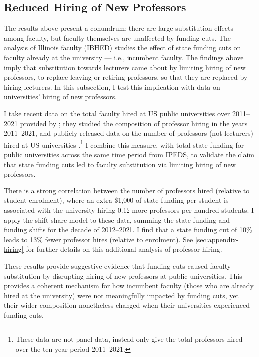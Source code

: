 \subsection{Reduced Hiring of New Professors}
The results above present a conundrum: there are large substitution effects among faculty, but faculty themselves are unaffected by funding cuts.
The analysis of Illinois faculty (IBHED) studies the effect of state funding cuts on faculty already at the university --- i.e., incumbent faculty.
The findings above imply that substitution towards lecturers came about by limiting hiring of new professors, to replace leaving or retiring professors, so that they are replaced by hiring lecturers.
In this subsection, I test this implication with data on universities' hiring of new professors.

I take recent data on the total faculty hired at US public universities over 2011--2021 provided by \cite{wapman2022quantifying};
they studied the composition of professor hiring in the years 2011--2021, and publicly released data on the number of professors (not lecturers) hired at US universities \citep{wapman2022zenodo}.\footnote{
    These data are not panel data, instead only give the total professors hired over the ten-year period 2011--2021.
}
I combine this measure, with total state funding for public universities across the same time period from IPEDS, to validate the claim that state funding cuts led to faculty substitution via limiting hiring of new professors.

There is a strong correlation between the number of professors hired (relative to student enrolment), where an extra \$1,000 of state funding per student is associated with the university hiring 0.12 more professors per hundred students.
I apply the shift-share model to these data, summing the state funding and funding shifts for the decade of 2012--2021.
I find that a state funding cut of 10\% leads to 13\% fewer professor hires (relative to enrolment).
See \autoref{sec:appendix-hiring} for further details on this additional analysis of professor hiring.

These results provide suggestive evidence that funding cuts caused faculty substitution by disrupting hiring of new professors at public universities.
This provides a coherent mechanism for how incumbent faculty (those who are already hired at the university) were not meaningfully impacted by funding cuts, yet their wider composition nonetheless changed when their universities experienced funding cuts.
